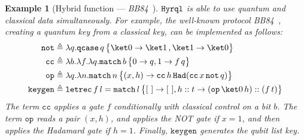 \documentclass[10pt,a4paper]{article}
\newcommand{\nil}{[~]}
\newcommand{\textqcase}{\ensuremath{\mathtt{qcase}}}
\newcommand{\textmatch}{\ensuremath{\mathtt{match}}}
\newcommand{\textletrec}{\ensuremath{\mathtt{letrec}}}
\newcommand{\zket}{\ket 0}
\newcommand{\oket}{\ket 1}
\newcommand{\qcasebase}[2]{
  \textqcase\,#1\left\{\! \begin{aligned} #2 \end{aligned}\right\}
}
\newcommand{\qcase}[3]{
  \qcasebase {#1} {\zket \to #2\,, \oket \to #3}
}
\newcommand{\match}[2]{
  \textmatch\,#1\left\{\! \begin{aligned} #2 \end{aligned}\right\}
}
\newcommand{\lbd}[2]{\lambda #1 .#2}
\newcommand{\letrec}[3]{\textletrec\,#1\,#2=#3}
\newcommand{\hyrql}{{{\tt{Hyrql}}}}
\newtheorem{example}[theorem]{Example}
\begin{document}
\begin{example}[Hybrid function --- \emph{BB84}~\cite{BB84}]
  \label{ex:hybrid-function}
  $\hyrql$ is able to use quantum and classical data simultaneously.
  For example, the well-known protocol \emph{BB84}~\cite{BB84}, creating
  a quantum key from a classical key, can be implemented as follows:
  \[
    \begin{aligned}
      \mathtt{not}&\triangleq \lbd q \qcase q \oket \zket \\
      \mathtt{cc} &\triangleq \lbd b \lbd f \lbd q \match b {
        0 \to q,
        1 \to f\,q
      } \\
      \mathtt{op} &\triangleq \lbd q \lbd n \match n {
        (x, h) \to
        \mathtt{cc}\,h\,\mathtt{Had}(\mathtt{cc}\,x\,\mathtt{not}\,q)
      } \\
      \mathtt{keygen} &\triangleq  \letrec f  l \match l {
        \nil \to \nil,
        h::t \to (\mathtt{op}\,\zket\,h) :: (f\,t)
      }
    \end{aligned}
  \]
  The term $\mathtt{cc}$ applies a gate $f$ conditionally with classical
  control on a bit $b$.
  The term $\mathtt{op}$ reads a pair $(x, h)$, and applies the NOT gate if
  $x = 1$, and then applies the Hadamard gate if $h = 1$. Finally,
  $\mathtt{keygen}$ generates the qubit list key.
\end{example}
\end{document}
